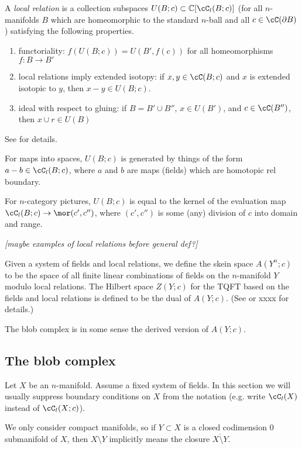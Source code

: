 \documentclass[11pt,leqno]{amsart}
\def\c{\mathbb{C}}
\def\bd{\partial}
\def\sub{\subset}
\def\setmin{\setminus}
\def\nn#1{{{\it \small [#1]}}}
\begin{document}
A {\it local relation} is a collection subspaces $U(B; c) \sub \c[\cC_l(B; c)]$
(for all $n$-manifolds $B$ which are
homeomorphic to the standard $n$-ball and 
all $c \in \cC(\bd B)$) satisfying the following properties.
\begin{enumerate}
\item functoriality: 
$f(U(B; c)) = U(B', f(c))$ for all homeomorphisms $f: B \to B'$
\item local relations imply extended isotopy: 
if $x, y \in \cC(B; c)$ and $x$ is extended isotopic 
to $y$, then $x-y \in U(B; c)$.
\item ideal with respect to gluing:
if $B = B' \cup B''$, $x\in U(B')$, and $c\in \cC(B'')$, then $x\cup r \in U(B)$
\end{enumerate}
See \cite{kw:tqft} for details.


For maps into spaces, $U(B; c)$ is generated by things of the form $a-b \in \cC_l(B; c)$,
where $a$ and $b$ are maps (fields) which are homotopic rel boundary.

For $n$-category pictures, $U(B; c)$ is equal to the kernel of the evaluation map
$\cC_l(B; c) \to \mor(c', c'')$, where $(c', c'')$ is some (any) division of $c$ into
domain and range.

\nn{maybe examples of local relations before general def?}

Given a system of fields and local relations, we define the skein space
$A(Y^n; c)$ to be the space of all finite linear combinations of fields on
the $n$-manifold $Y$ modulo local relations.
The Hilbert space $Z(Y; c)$ for the TQFT based on the fields and local relations
is defined to be the dual of $A(Y; c)$.
(See \cite{kw:tqft} or xxxx for details.)

The blob complex is in some sense the derived version of $A(Y; c)$.



\subsection{The blob complex}
\label{sec:blob-definition}

Let $X$ be an $n$-manifold.
Assume a fixed system of fields.
In this section we will usually suppress boundary conditions on $X$ from the notation
(e.g. write $\cC_l(X)$ instead of $\cC_l(X; c)$).

We only consider compact manifolds, so if $Y \sub X$ is a closed codimension 0
submanifold of $X$, then $X \setmin Y$ implicitly means the closure
$\overline{X \setmin Y}$.
\end{document}
